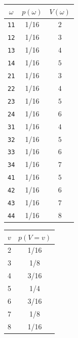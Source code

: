 \begin{center}
\begin{minipage}{0.4\textwidth}
\begin{tabular}{c|c|c}
\textbf{$\omega$} & \textbf{$p(\omega)$} & \textbf{$V(\omega)$}\\
\hline
\texttt{11}		& 1/16 &		$2$\\
\texttt{12}		& 1/16 &		$3$\\
\texttt{13}		& 1/16 &		$4$\\
\texttt{14}		& 1/16 &		$5$\\
\texttt{21}		& 1/16 &		$3$\\
\texttt{22}		& 1/16 &		$4$\\
\texttt{23}		& 1/16 &		$5$\\
\texttt{24}		& 1/16 &		$6$\\
\texttt{31}		& 1/16 &		$4$\\
\texttt{32}		& 1/16 &		$5$\\
\texttt{33}		& 1/16 &		$6$\\
\texttt{34}		& 1/16 &		$7$\\
\texttt{41}		& 1/16 &		$5$\\
\texttt{42}		& 1/16 &		$6$\\
\texttt{43}		& 1/16 &		$7$\\
\texttt{44}		& 1/16 &		$8$\\
\end{tabular}%
%
\begin{tabular}{c|c}
\textbf{$v$} &	\textbf{$p(V=v)$}\\
\hline
2 & 		1/16\\
3 & 		1/8\\
4 & 		3/16\\
5 & 		1/4\\
6 & 		3/16\\
7 & 		1/8\\
8 & 		1/16\\
\end{tabular}%
\end{minipage}\begin{minipage}{0.55\textwidth}
\end{minipage}

\end{center}

